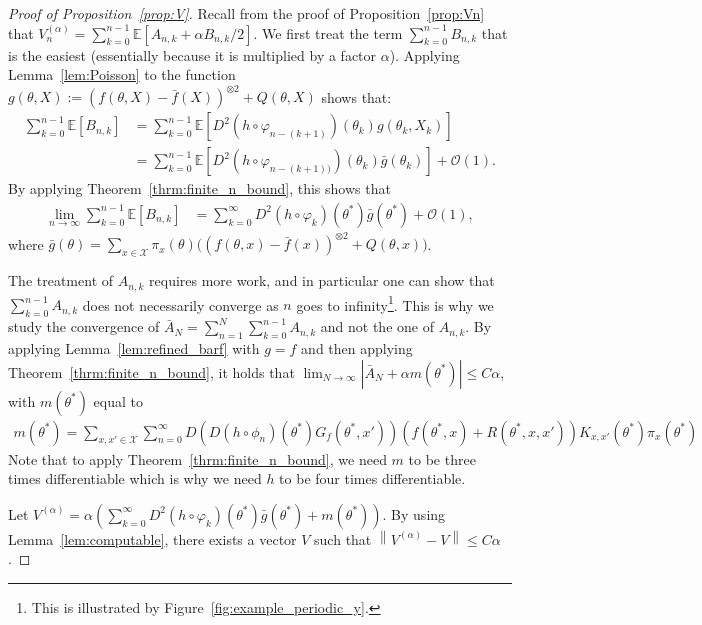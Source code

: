 \documentclass{article}
\newcommand{\calX}{\mathcal{X}}
\newcommand\E{\mathbb{E}}
\newcommand\esp[1]{\E\left[#1\right]}
\newcommand\abs[1]{\left|#1\right|}
\newcommand\norm[1]{\left\|#1\right\|}
\newcommand\toA{^{(\alpha)}}
\newcommand\bO[1]{\mathcal{O}(#1)}
\newcommand\barf{\bar{f}}
\begin{document}
\begin{proof}[Proof of Proposition~\ref{prop:V}]
    Recall from the proof of Proposition~\ref{prop:Vn} that $V\toA_n=\sum_{k=0}^{n-1}\esp{A_{n,k} + \alpha B_{n,k}/2}$. We first treat the term $\sum_{k=0}^{n-1}B_{n,k}$ that is the easiest (essentially because it is multiplied by a factor $\alpha$). Applying Lemma~\ref{lem:Poisson} to the function $g(\theta,X):=(f (\theta,X)-\barf(X))^{\otimes 2} + Q(\theta,X)$ shows that: 
    \begin{align*}
        \sum_{k=0}^{n-1}\esp{B_{n,k}} &= \sum_{k=0}^{n-1}\esp{D^2(h\circ\varphi_{n-(k+1)})(\theta_k)g(\theta_k,X_k)}\\
        &= \sum_{k=0}^{n-1} \esp{D^2(h\circ\varphi_{n-(k+1))})(\theta_k)\bar{g}(\theta_k)} + \bO{1}.
    \end{align*}
    By applying Theorem~\ref{thrm:finite_n_bound}, this shows that
    \begin{align}
        \label{eq:limit_B_n_k}
        \lim_{n\to\infty} \sum_{k=0}^{n-1}\esp{B_{n,k}} &= \sum_{k=0}^{\infty} D^2(h\circ\varphi_{k})(\theta^*)\bar{g}(\theta^*) + \bO{1},
    \end{align}
    where $\bar{g}(\theta)=\sum_{x\in\calX}\pi_x(\theta)\bigl((f (\theta,x)-\barf(x))^{\otimes 2} + Q(\theta,x)\bigr)$. 

    The treatment of $A_{n,k}$ requires more work, and in particular one can show that $\sum_{k=0}^{n-1}A_{n,k}$ does not necessarily converge as $n$ goes to infinity\footnote{This is illustrated by Figure~\ref{fig:example_periodic_y}.}. This is why we study the convergence of $\bar{A}_{N} = \sum_{n=1}^N\sum_{k=0}^{n-1}A_{n,k}$ and not the one of $A_{n,k}$. By applying Lemma~\ref{lem:refined_barf} with $g=f$ and then applying Theorem~\ref{thrm:finite_n_bound}, it holds that $\lim_{N\to\infty}\abs{\bar{A}_N + \alpha m(\theta^*)}\le C\alpha$, with $m(\theta^*)$ equal to 
    \begin{align*}
        m(\theta^*) = \sum_{x,x'\in\calX} \sum_{n=0}^\infty D(D(h\circ\phi_n)(\theta^*) G_f(\theta^*, x'))(f(\theta^*,x)+R(\theta^*,x,x'))K_{x,x'}(\theta^*)\pi_x(\theta^*)
    \end{align*}
    Note that to apply Theorem~\ref{thrm:finite_n_bound}, we need $m$ to be three times differentiable which is why we need $h$ to be four times differentiable. 

    Let $V\toA = \alpha(\sum_{k=0}^{\infty} D^2(h\circ\varphi_{k})(\theta^*)\bar{g}(\theta^*) + m(\theta^*))$. By using Lemma~\ref{lem:computable}, there exists a vector $V$ such that $\norm{V\toA-V}\le C\alpha$.
\end{proof}
\end{document}

